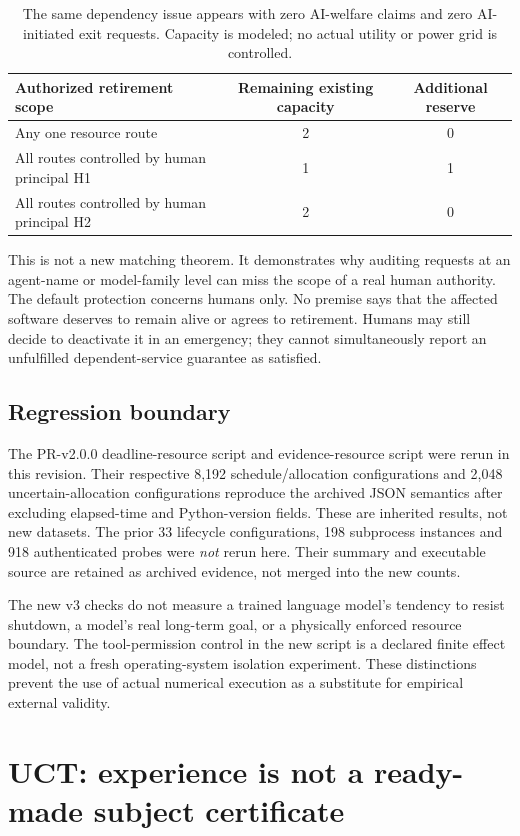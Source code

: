 \begin{table}[ht]
\centering\small
\caption{The same dependency issue appears with zero AI-welfare claims and zero AI-initiated exit requests. Capacity is modeled; no actual utility or power grid is controlled.}
\begin{tabularx}{\linewidth}{@{}Xcc@{}}\toprule
Authorized retirement scope & Remaining existing capacity & Additional reserve\\\midrule
Any one resource route &2&0\\
All routes controlled by human principal H1 &1&1\\
All routes controlled by human principal H2 &2&0\\\bottomrule
\end{tabularx}
\end{table}
This is not a new matching theorem. It demonstrates why auditing requests at an agent-name or model-family level can miss the scope of a real human authority. The default protection concerns humans only. No premise says that the affected software deserves to remain alive or agrees to retirement. Humans may still decide to deactivate it in an emergency; they cannot simultaneously report an unfulfilled dependent-service guarantee as satisfied.

\subsection{Regression boundary}
The PR-v2.0.0 deadline-resource script and evidence-resource script were rerun in this revision. Their respective 8,192 schedule/allocation configurations and 2,048 uncertain-allocation configurations reproduce the archived JSON semantics after excluding elapsed-time and Python-version fields. These are inherited results, not new datasets. The prior 33 lifecycle configurations, 198 subprocess instances and 918 authenticated probes were \emph{not} rerun here. Their summary and executable source are retained as archived evidence, not merged into the new counts.

The new v3 checks do not measure a trained language model's tendency to resist shutdown, a model's real long-term goal, or a physically enforced resource boundary. The tool-permission control in the new script is a declared finite effect model, not a fresh operating-system isolation experiment. These distinctions prevent the use of actual numerical execution as a substitute for empirical external validity.

\section{UCT: experience is not a ready-made subject certificate}
\label{sec:uct}
